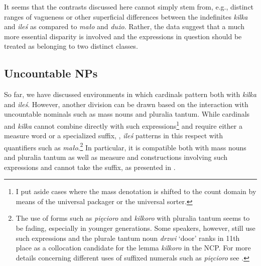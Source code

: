 \documentclass[output=paper, newtxmath, colorlinks, citecolor=brown]{langsci/langscibook}
\begin{document}
	\ea \label{ex:distributive-po-malo} 
	\z
    \z

	\noindent It seems that the contrasts discussed here cannot simply stem from, e.g., distinct ranges of vagueness or other superficial differences between the indefinites \textit{kilka} and \textit{ileś} as compared to \textit{mało} and \textit{dużo}. Rather, the data suggest that a much more essential disparity is involved and the expressions in question should be treated as belonging to two distinct classes.

	\subsection{Uncountable NPs}\label{sec:uncountable-nps}

	So far, we have discussed environments in which cardinals pattern both with \textit{kilka} and \textit{ileś}. However, another division can be drawn based on the interaction with uncountable nominals such as mass nouns and pluralia tantum. While cardinals and \textit{kilka} cannot combine directly with such expressions\footnote{I put aside cases where the mass denotation is shifted to the count domain by means of the universal packager or the universal sorter.} and require either a measure word or a specialized  suffix, , \textit{ileś} patterns in this respect with quantifiers such as \textit{mało}.\footnote{The use of forms such as \textit{pięcioro} and \textit{kilkoro} with pluralia tantum seems to be fading, especially in younger generations. Some speakers, however, still use such expressions and the plurale tantum noun \textit{drzwi} `door' ranks in 11th place as a collocation candidate for the lemma \textit{kilkoro} in the NCP. For more details concerning different uses of suffixed numerals such as \textit{pięcioro} see \cite{wagiel2014boys,wagiel2015sums}.} In particular, it is compatible both with mass nouns and pluralia tantum as well as measure and  constructions involving such expressions and cannot take the  suffix, as presented in .
\end{document}
